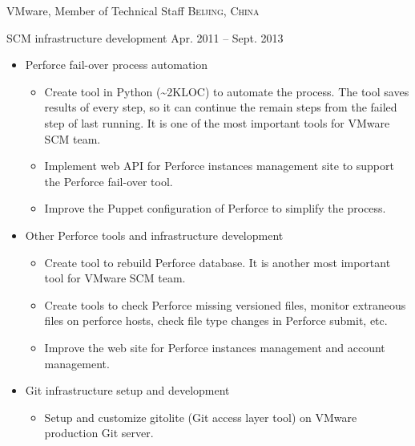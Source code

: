 \documentclass[10pt,letterpaper]{article}
\begin{document}
\headedsection
{VMware, Member of Technical Staff}
{\textsc{Beijing, China}}{

\headedsubsection %
{SCM infrastructure development} {Apr. 2011 -- Sept. 2013}
{
    \begin{itemize}
        \item Perforce fail-over process automation
            \begin{itemize}
                \item Create tool in Python (\~{}2KLOC) to automate the
                    process.
                    The tool saves results of every step, so it can continue
                    the remain steps from the failed step of last running.
                    It is one of the most important tools for VMware SCM team.

                \item Implement web API for Perforce instances management site
                    to support the Perforce fail-over tool.

                \item Improve the Puppet configuration of Perforce to simplify
                    the process.
            \end{itemize}
        \item Other Perforce tools and infrastructure development
            \begin{itemize}
                \item Create tool to rebuild Perforce database.
                    It is another most important tool for VMware SCM team. 

                \item Create tools to check Perforce missing versioned files,
                    monitor extraneous files on perforce hosts, check file type
                    changes in Perforce submit, etc.

                \item Improve the web site for Perforce instances management
                    and account management.
            \end{itemize}
        \item Git infrastructure setup and development
            \begin{itemize}
                \item Setup and customize gitolite (Git access layer tool) on
                    VMware production Git server.
                    

\end{itemize}
\end{itemize}}}
\end{document}
